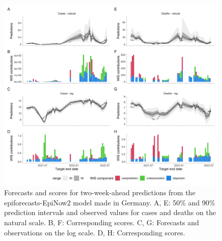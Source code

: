 \documentclass{article}
\begin{document}
\begin{figure}[h!]
    \centering
    \includegraphics[width=0.99\textwidth]{output/figures/HUB-model-comparison-epinow.png}
    \caption{
    Forecasts and scores for two-week-ahead predictions from the epiforecasts-EpiNow2 model made in Germany. A, E: 50\% and 90\% prediction intervals and observed values for cases and deaths on the natural scale. B, F: Corresponding scores. C, G: Forecasts and observations on the log scale. D, H: Corresponding scores. 
    }
    \label{fig:HUB-model-comparison-epinow}
\end{figure}



\clearpage

\end{document}
